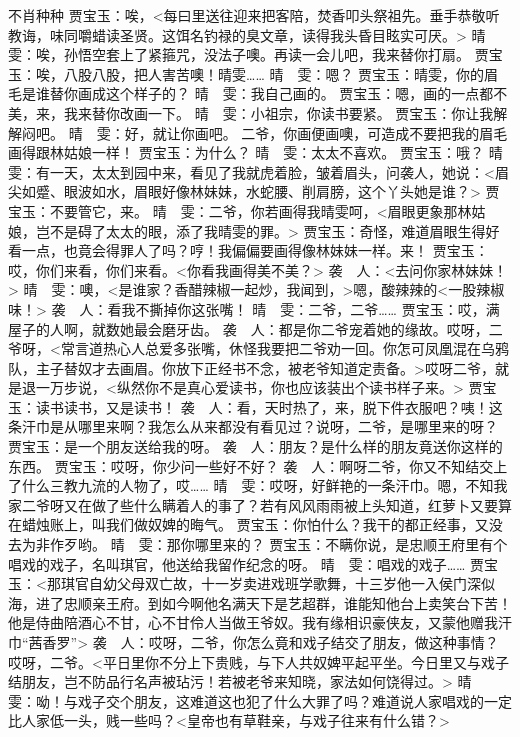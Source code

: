 \documentclass{article}
\begin{document}
不肖种种
贾宝玉：唉，<每曰里送往迎来把客陪，焚香叩头祭祖先。垂手恭敬听教诲，味同嚼蜡读圣贤。这饵名钓禄的臭文章，读得我头昏目眩实可厌。>
晴　雯：唉，孙悟空套上了紧箍咒，没法子噢。再读一会儿吧，我来替你打扇。
贾宝玉：唉，八股八股，把人害苦噢！晴雯……
晴　雯：嗯？
贾宝玉：晴雯，你的眉毛是谁替你画成这个样子的？ 
晴　雯：我自己画的。 
贾宝玉：嗯，画的一点都不美，来，我来替你改画一下。 
晴　雯：小祖宗，你读书要紧。 
贾宝玉：你让我解解闷吧。 
晴　雯：好，就让你画吧。 二爷，你画便画噢，可造成不要把我的眉毛画得跟林姑娘一样！
贾宝玉：为什么？
晴　雯：太太不喜欢。
贾宝玉：哦？
晴　雯：有一天，太太到园中来，看见了我就虎着脸，皱着眉头，问袭人，她说：<眉尖如蹙、眼波如水，眉眼好像林妹妹，水蛇腰、削肩膀，这个丫头她是谁？>
贾宝玉：不要管它，来。
晴　雯：二爷，你若画得我晴雯呵，<眉眼更象那林姑娘，岂不是碍了太太的眼，添了我晴雯的罪。>
贾宝玉：奇怪，难道眉眼生得好看一点，也竟会得罪人了吗？哼！我偏偏要画得像林妹妹一样。来！
贾宝玉：哎，你们来看，你们来看。<你看我画得美不美？>
袭　人：<去问你家林妹妹！>
晴　雯：噢，<是谁家？香醋辣椒一起炒，我闻到，>嗯，酸辣辣的<一股辣椒味！>
袭　人：看我不撕掉你这张嘴！
晴　雯：二爷，二爷……
贾宝玉：哎，满屋子的人啊，就数她最会磨牙齿。
袭　人：都是你二爷宠着她的缘故。哎呀，二爷呀，<常言道热心人总爱多张嘴，休怪我要把二爷劝一回。你怎可凤凰混在乌鸦队，主子替奴才去画眉。你放下正经书不念，被老爷知道定责备。>哎呀二爷，就是退一万步说，<纵然你不是真心爱读书，你也应该装出个读书样子来。>
贾宝玉：读书读书，又是读书！ 
袭　人：看，天时热了，来，脱下件衣服吧？咦！这条汗巾是从哪里来啊？我怎么从来都没有看见过？说呀，二爷，是哪里来的呀？
贾宝玉：是一个朋友送给我的呀。
袭　人：朋友？是什么样的朋友竟送你这样的东西。
贾宝玉：哎呀，你少问一些好不好？
袭　人：啊呀二爷，你又不知结交上了什么三教九流的人物了，哎……
晴　雯：哎呀，好鲜艳的一条汗巾。嗯，不知我家二爷呀又在做了些什么瞒着人的事了？若有风风雨雨被上头知道，红萝卜又要算在蜡烛账上，叫我们做奴婢的晦气。
贾宝玉：你怕什么？我干的都正经事，又没去为非作歹哟。
晴　雯：那你哪里来的？
贾宝玉：不瞒你说，是忠顺王府里有个唱戏的戏子，名叫琪官，他送给我留作纪念的呀。
晴　雯：唱戏的戏子……
贾宝玉：<那琪官自幼父母双亡故，十一岁卖进戏班学歌舞，十三岁他一入侯门深似海，进了忠顺亲王府。到如今啊他名满天下是艺超群，谁能知他台上卖笑台下苦！他是侍曲陪酒心不甘，心不甘伶人当做王爷奴。我有缘相识豪侠友，又蒙他赠我汗巾“茜香罗”>
袭　人：哎呀，二爷，你怎么竟和戏子结交了朋友，做这种事情？哎呀，二爷。<平日里你不分上下贵贱，与下人共奴婢平起平坐。今日里又与戏子结朋友，岂不防品行名声被玷污！若被老爷来知晓，家法如何饶得过。>
晴　雯：呦！与戏子交个朋友，这难道这也犯了什么大罪了吗？难道说人家唱戏的一定比人家低一头，贱一些吗？<皇帝也有草鞋亲，与戏子往来有什么错？>
\end{document}
